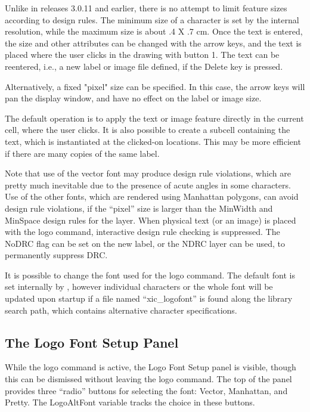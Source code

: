 Unlike in releases 3.0.11 and earlier, there is no attempt to limit
feature sizes according to design rules.  The minimum size of a
character is set by the internal resolution, while the maximum size is
about .4 X .7 cm.  Once the text is entered, the size and other
attributes can be changed with the arrow keys, and the text is placed
where the user clicks in the drawing with button 1.  The text can be
reentered, i.e., a new label or image file defined, if the {\kb
Delete} key is pressed.

Alternatively, a fixed "pixel" size can be specified.  In this case,
the arrow keys will pan the display window, and have no effect on the
label or image size.

The default operation is to apply the text or image feature directly
in the current cell, where the user clicks.  It is also possible to
create a subcell containing the text, which is instantiated at the
clicked-on locations.  This may be more efficient if there are many
copies of the same label.

Note that use of the vector font may produce design rule violations,
which are pretty much inevitable due to the presence of acute angles
in some characters.  Use of the other fonts, which are rendered using
Manhattan polygons, can avoid design rule violations, if the ``pixel''
size is larger than the MinWidth and MinSpace design rules for the
layer.  When physical text (or an image) is placed with the {\cb logo}
command, interactive design rule checking is suppressed.  The {\et
NoDRC} flag can be set on the new label, or the NDRC layer can be
used, to permanently suppress DRC.

It is possible to change the font used for the {\cb logo} command. 
The default font is set internally by {\Xic}, however individual
characters or the whole font will be updated upon startup if a file
named ``{\vt xic\_logofont}'' is found along the library search path,
which contains alternative character specifications.

\subsection{The Logo Font Setup Panel}

While the {\cb logo} command is active, the {\cb Logo Font Setup}
panel is visible, though this can be dismissed without leaving the
{\cb logo} command.  The top of the panel provides three ``radio''
buttons for selecting the font:  {\cb Vector}, {\cb Manhattan}, and
{\cb Pretty}.  The {\et LogoAltFont} variable tracks the choice in
these buttons.

